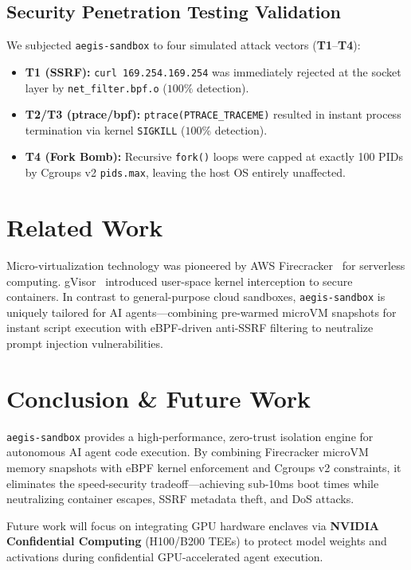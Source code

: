 \documentclass[11pt,a4paper]{article}
\begin{document}
\subsection{Security Penetration Testing Validation}
We subjected \texttt{aegis-sandbox} to four simulated attack vectors (\textbf{T1}--\textbf{T4}):
\begin{itemize}
    \item \textbf{T1 (SSRF):} \texttt{curl 169.254.169.254} was immediately rejected at the socket layer by \texttt{net\_filter.bpf.o} ($100\%$ detection).
    \item \textbf{T2/T3 (ptrace/bpf):} \texttt{ptrace(PTRACE\_TRACEME)} resulted in instant process termination via kernel \texttt{SIGKILL} ($100\%$ detection).
    \item \textbf{T4 (Fork Bomb):} Recursive \texttt{fork()} loops were capped at exactly 100 PIDs by Cgroups v2 \texttt{pids.max}, leaving the host OS entirely unaffected.
\end{itemize}

\section{Related Work}
Micro-virtualization technology was pioneered by AWS Firecracker~\cite{firecracker} for serverless computing. gVisor~\cite{gvisor} introduced user-space kernel interception to secure containers. In contrast to general-purpose cloud sandboxes, \texttt{aegis-sandbox} is uniquely tailored for AI agents—combining pre-warmed microVM snapshots for instant script execution with eBPF-driven anti-SSRF filtering to neutralize prompt injection vulnerabilities.

\section{Conclusion \& Future Work}
\texttt{aegis-sandbox} provides a high-performance, zero-trust isolation engine for autonomous AI agent code execution. By combining Firecracker microVM memory snapshots with eBPF kernel enforcement and Cgroups v2 constraints, it eliminates the speed-security tradeoff—achieving sub-10ms boot times while neutralizing container escapes, SSRF metadata theft, and DoS attacks. 

Future work will focus on integrating GPU hardware enclaves via \textbf{NVIDIA Confidential Computing} (H100/B200 TEEs) to protect model weights and activations during confidential GPU-accelerated agent execution.
\end{document}
